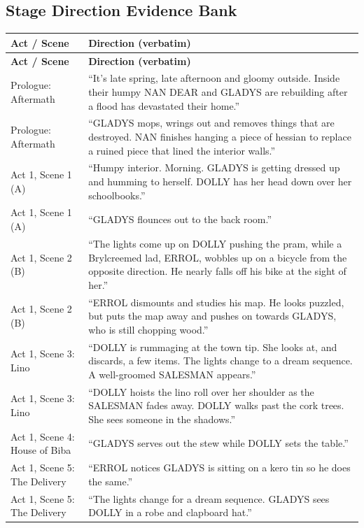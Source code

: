 \documentclass[a4paper]{article}
\begin{document}
\subsection{Stage Direction Evidence Bank}
\renewcommand{\arraystretch}{1}
\begin{longtable}{|p{3.4cm}|p{9.6cm}|}
\hline
\textbf{Act / Scene} & \textbf{Direction (verbatim)} \\
\hline
\endfirsthead
\hline
\textbf{Act / Scene} & \textbf{Direction (verbatim)} \\
\hline
\endhead
Prologue: Aftermath & ``It's late spring, late afternoon and gloomy outside. Inside their humpy NAN DEAR and GLADYS are rebuilding after a flood has devastated their home.'' \\
\hline
Prologue: Aftermath & ``GLADYS mops, wrings out and removes things that are destroyed. NAN finishes hanging a piece of hessian to replace a ruined piece that lined the interior walls.'' \\
\hline
Act 1, Scene 1 (A) & ``Humpy interior. Morning. GLADYS is getting dressed up and humming to herself. DOLLY has her head down over her schoolbooks.'' \\
\hline
Act 1, Scene 1 (A) & ``GLADYS flounces out to the back room.'' \\
\hline
Act 1, Scene 2 (B) & ``The lights come up on DOLLY pushing the pram, while a Brylcreemed lad, ERROL, wobbles up on a bicycle from the opposite direction. He nearly falls off his bike at the sight of her.'' \\
\hline
Act 1, Scene 2 (B) & ``ERROL dismounts and studies his map. He looks puzzled, but puts the map away and pushes on towards GLADYS, who is still chopping wood.'' \\
\hline
Act 1, Scene 3: Lino & ``DOLLY is rummaging at the town tip. She looks at, and discards, a few items. The lights change to a dream sequence. A well-groomed SALESMAN appears.'' \\
\hline
Act 1, Scene 3: Lino & ``DOLLY hoists the lino roll over her shoulder as the SALESMAN fades away. DOLLY walks past the cork trees. She sees someone in the shadows.'' \\
\hline
Act 1, Scene 4: House of Biba & ``GLADYS serves out the stew while DOLLY sets the table.'' \\
\hline
Act 1, Scene 5: The Delivery & ``ERROL notices GLADYS is sitting on a kero tin so he does the same.'' \\
\hline
Act 1, Scene 5: The Delivery & ``The lights change for a dream sequence. GLADYS sees DOLLY in a robe and clapboard hat.'' \\

\end{longtable}
\end{document}
